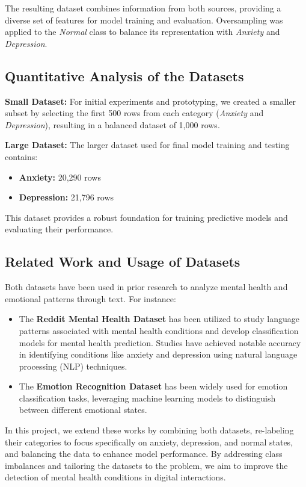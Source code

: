 \documentclass[runningheads,a4paper,11pt]{report}
\begin{document}
The resulting dataset combines information from both sources, providing a diverse set of features for model training and evaluation. Oversampling was applied to the \textit{Normal} class to balance its representation with \textit{Anxiety} and \textit{Depression}.

\subsection{Quantitative Analysis of the Datasets}
\label{section:analysis}

\textbf{Small Dataset:} For initial experiments and prototyping, we created a smaller subset by selecting the first 500 rows from each category (\textit{Anxiety} and \textit{Depression}), resulting in a balanced dataset of 1,000 rows.

\textbf{Large Dataset:} The larger dataset used for final model training and testing contains:
\begin{itemize}
    \item \textbf{Anxiety:} 20,290 rows
    \item \textbf{Depression:} 21,796 rows
\end{itemize}
This dataset provides a robust foundation for training predictive models and evaluating their performance.

\subsection{Related Work and Usage of Datasets}
\label{section:usage}
Both datasets have been used in prior research to analyze mental health and emotional patterns through text. For instance:
\begin{itemize}
    \item The \textbf{Reddit Mental Health Dataset} has been utilized to study language patterns associated with mental health conditions and develop classification models for mental health prediction. Studies have achieved notable accuracy in identifying conditions like anxiety and depression using natural language processing (NLP) techniques.
    \item The \textbf{Emotion Recognition Dataset} has been widely used for emotion classification tasks, leveraging machine learning models to distinguish between different emotional states.
\end{itemize}

In this project, we extend these works by combining both datasets, re-labeling their categories to focus specifically on anxiety, depression, and normal states, and balancing the data to enhance model performance. By addressing class imbalances and tailoring the datasets to the problem, we aim to improve the detection of mental health conditions in digital interactions.
\end{document}
